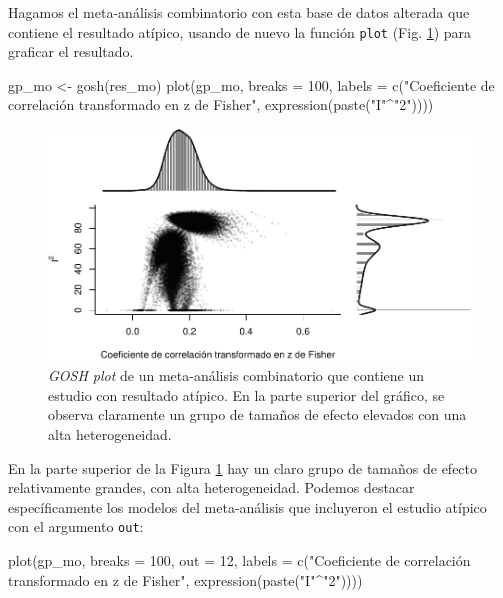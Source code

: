 \documentclass[
  bookmarksnumbered]{article}
\newenvironment{Shaded}{\begin{snugshade}}{\end{snugshade}}
\newcommand{\AttributeTok}[1]{\textcolor[rgb]{0.00,0.34,0.68}{#1}}
\newcommand{\DecValTok}[1]{\textcolor[rgb]{0.69,0.50,0.00}{#1}}
\newcommand{\FunctionTok}[1]{\textcolor[rgb]{0.39,0.29,0.61}{#1}}
\newcommand{\NormalTok}[1]{\textcolor[rgb]{0.12,0.11,0.11}{#1}}
\newcommand{\OtherTok}[1]{\textcolor[rgb]{0.00,0.43,0.16}{#1}}
\newcommand{\SpecialCharTok}[1]{\textcolor[rgb]{0.24,0.68,0.91}{#1}}
\newcommand{\StringTok}[1]{\textcolor[rgb]{0.75,0.01,0.01}{#1}}
\begin{document}
Hagamos el meta-análisis combinatorio con esta base de datos alterada que contiene el resultado atípico, usando de nuevo la función \texttt{plot} (Fig. \ref{fig:gosh2}) para graficar el resultado.

\begin{Shaded}
\begin{Highlighting}[]
\NormalTok{gp\_mo }\OtherTok{\textless{}{-}} \FunctionTok{gosh}\NormalTok{(res\_mo)}
\FunctionTok{plot}\NormalTok{(gp\_mo, }\AttributeTok{breaks =} \DecValTok{100}\NormalTok{,}
     \AttributeTok{labels =} \FunctionTok{c}\NormalTok{(}\StringTok{"Coeficiente de correlación transformado en z de Fisher"}\NormalTok{, }
                \FunctionTok{expression}\NormalTok{(}\FunctionTok{paste}\NormalTok{(}\StringTok{"I"}\SpecialCharTok{\^{}}\StringTok{"2"}\NormalTok{))))}
\end{Highlighting}
\end{Shaded}

\begin{figure}
\centering
\includegraphics{Meta-analysis_files/figure-latex/gosh2-1.pdf}
\caption{\label{fig:gosh2}\emph{GOSH plot} de un meta-análisis combinatorio que contiene un estudio con resultado atípico. En la parte superior del gráfico, se observa claramente un grupo de tamaños de efecto elevados con una alta heterogeneidad.}
\end{figure}

En la parte superior de la Figura \ref{fig:gosh2} hay un claro grupo de tamaños de efecto relativamente grandes, con alta heterogeneidad. Podemos destacar específicamente los modelos del meta-análisis que incluyeron el estudio atípico con el argumento \texttt{out}:

\begin{Shaded}
\begin{Highlighting}[]
\FunctionTok{plot}\NormalTok{(gp\_mo, }\AttributeTok{breaks =} \DecValTok{100}\NormalTok{, }\AttributeTok{out =} \DecValTok{12}\NormalTok{,}
     \AttributeTok{labels =} \FunctionTok{c}\NormalTok{(}\StringTok{"Coeficiente de correlación transformado en z de Fisher"}\NormalTok{, }
                \FunctionTok{expression}\NormalTok{(}\FunctionTok{paste}\NormalTok{(}\StringTok{"I"}\SpecialCharTok{\^{}}\StringTok{"2"}\NormalTok{))))}
\end{Highlighting}
\end{Shaded}
\end{document}
